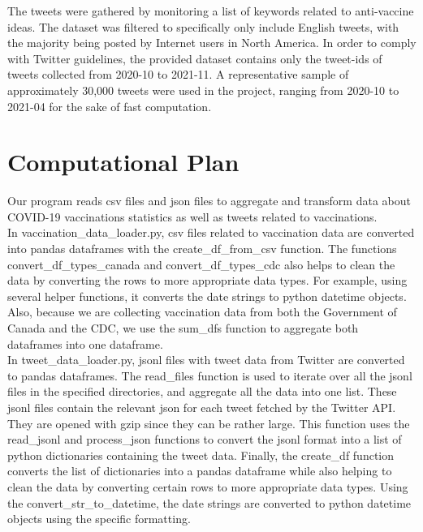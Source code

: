 \documentclass[fontsize=11pt]{article}
\begin{document}
The tweets were gathered by monitoring a list of keywords related to anti-vaccine ideas. The dataset was filtered to specifically only include English tweets, with the majority being posted by Internet users in North America. In order to comply with Twitter guidelines, the provided dataset contains only the tweet-ids of tweets collected from 2020-10 to 2021-11. A representative sample of approximately 30,000 tweets were used in the project, ranging from 2020-10 to 2021-04 for the sake of fast computation.\\




\section*{Computational Plan}

Our program reads csv files and json files to aggregate and transform data about COVID-19 vaccinations statistics as well as tweets related to vaccinations.\\

In vaccination\_data\_loader.py, csv files related to vaccination data are converted into pandas dataframes with the create\_df\_from\_csv function. The functions convert\_df\_types\_canada and convert\_df\_types\_cdc also helps to clean the data by converting the rows to more appropriate data types. For example, using several helper functions, it converts the date strings to python datetime objects. Also, because we are collecting vaccination data from both the Government of Canada and the CDC, we use the sum\_dfs function to aggregate both dataframes into one dataframe.\\

In tweet\_data\_loader.py, jsonl files with tweet data from Twitter are converted to pandas dataframes. The read\_files function is used to iterate over all the jsonl files in the specified directories, and aggregate all the data into one list. These jsonl files contain the relevant json for each tweet fetched by the Twitter API. They are opened with gzip since they can be rather large. This function uses the read\_jsonl and process\_json functions to convert the jsonl format into a list of python dictionaries containing the tweet data. Finally, the create\_df function converts the list of dictionaries into a pandas dataframe while also helping to clean the data by converting certain rows to more appropriate data types. Using the convert\_str\_to\_datetime, the date strings are converted to python datetime objects using the specific formatting. \\
\end{document}
